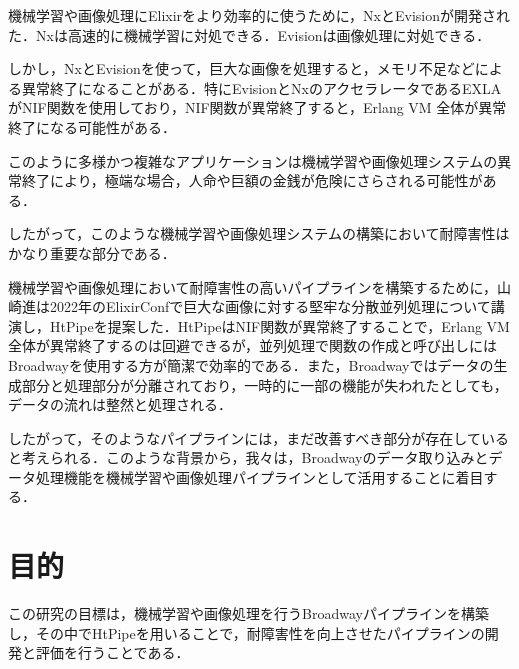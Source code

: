 \documentclass[a4paper]{jreport}	%
\begin{document}
機械学習や画像処理にElixirをより効率的に使うために，NxとEvisionが開発された．Nxは高速的に機械学習に対処できる．Evisionは画像処理に対処できる．

しかし，NxとEvisionを使って，巨大な画像を処理すると，メモリ不足などによる異常終了になることがある．特にEvisionとNxのアクセラレータであるEXLAがNIF関数を使用しており，NIF関数が異常終了すると，Erlang VM 全体が異常終了になる可能性がある．

このように多様かつ複雑なアプリケーションは機械学習や画像処理システムの異常終了により，極端な場合，人命や巨額の金銭が危険にさらされる可能性がある．

したがって，このような機械学習や画像処理システムの構築において耐障害性はかなり重要な部分である．

機械学習や画像処理において耐障害性の高いパイプラインを構築するために，山崎進は2022年のElixirConfで巨大な画像に対する堅牢な分散並列処理について講演し，HtPipeを提案した\cite{E}．HtPipeはNIF関数が異常終了することで，Erlang VM全体が異常終了するのは回避できるが，並列処理で関数の作成と呼び出しにはBroadwayを使用する方が簡潔で効率的である．また，Broadwayではデータの生成部分と処理部分が分離されており，一時的に一部の機能が失われたとしても，データの流れは整然と処理される．

したがって，そのようなパイプラインには，まだ改善すべき部分が存在していると考えられる．このような背景から，我々は，Broadwayのデータ取り込みとデータ処理機能を機械学習や画像処理パイプラインとして活用することに着目する．




\section{目的}

この研究の目標は，機械学習や画像処理を行うBroadwayパイプラインを構築し，その中でHtPipeを用いることで，耐障害性を向上させたパイプラインの開発と評価を行うことである．
\end{document}
